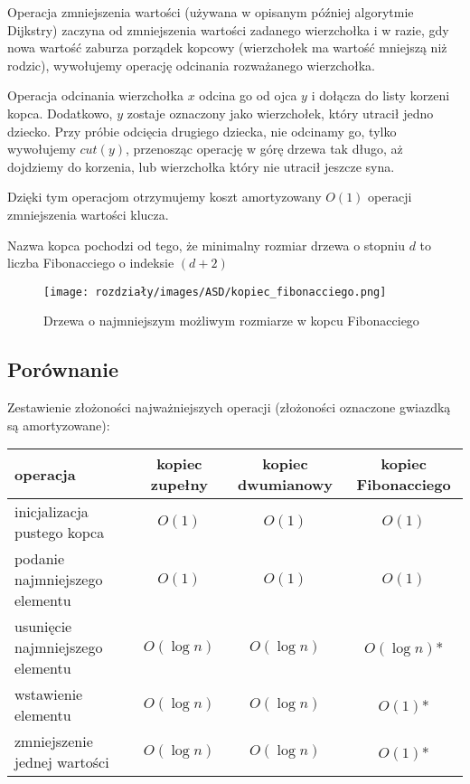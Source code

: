 Operacja zmniejszenia wartości (używana w opisanym później algorytmie Dijkstry) zaczyna od zmniejszenia wartości zadanego wierzchołka
i w razie, gdy nowa wartość zaburza porządek kopcowy (wierzchołek ma wartość mniejszą niż rodzic), wywołujemy operację odcinania rozważanego wierzchołka.

Operacja odcinania wierzchołka $x$ odcina go od ojca $y$ i dołącza do listy korzeni kopca. Dodatkowo, $y$ zostaje oznaczony jako wierzchołek, który utracił jedno dziecko. 
Przy próbie odcięcia drugiego dziecka, nie odcinamy go, tylko wywołujemy $cut(y)$, przenosząc operację w górę drzewa tak długo, aż dojdziemy do korzenia, lub wierzchołka który nie utracił jeszcze syna.

Dzięki tym operacjom otrzymujemy koszt amortyzowany $O(1)$ operacji zmniejszenia wartości klucza.

Nazwa kopca pochodzi od tego, że minimalny rozmiar drzewa o stopniu $d$ to liczba Fibonacciego o indeksie $(d + 2)$

\begin{figure}[H]
    \centering
    \texttt{[image: rozdziały/images/ASD/kopiec\_fibonacciego.png]}
    \caption{Drzewa o najmniejszym możliwym rozmiarze w kopcu Fibonacciego}
\end{figure}

\subsection{Porównanie}

Zestawienie złożoności najważniejszych operacji (złożoności oznaczone gwiazdką są amortyzowane):

\begin{tabular}{ |l|c|c|c| }
    \hline
    operacja & kopiec zupełny & kopiec dwumianowy  & kopiec Fibonacciego \\
    \hline
    inicjalizacja pustego kopca & $O(1)$ & $O(1)$ & $O(1)$ \\
    \hline
    podanie najmniejszego elementu & $O(1)$ & $O(1)$ & $O(1)$ \\
    \hline
    usunięcie najmniejszego elementu & $O(\log n)$ & $O(\log n)$ & $O(\log n)$* \\
    \hline
    wstawienie elementu & $O(\log n)$ & $O(\log n)$ & $O(1)$* \\
    \hline
    zmniejszenie jednej wartości & $O(\log n)$ & $O(\log n)$ & $O(1)$* \\
    \hline
\end{tabular}

